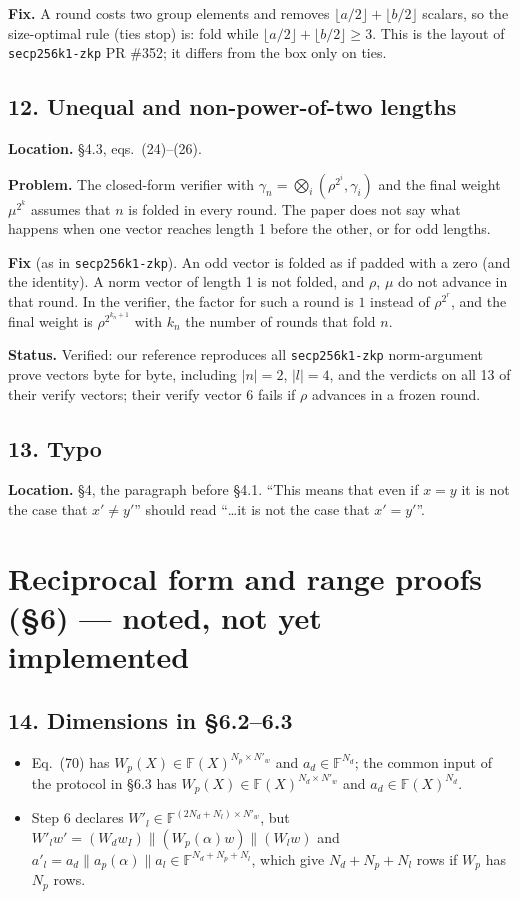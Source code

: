\documentclass[11pt,a4paper]{article}
\newcommand{\F}{\mathbb{F}}
\newcommand{\status}[1]{\par\noindent\textbf{Status.} #1}
\newcommand{\loc}[1]{\par\noindent\textbf{Location.} #1}
\begin{document}
\noindent\textbf{Fix.} A round costs two group elements and removes
$\lfloor a/2\rfloor + \lfloor b/2\rfloor$ scalars, so the size-optimal rule (ties stop) is: fold
while $\lfloor a/2\rfloor + \lfloor b/2\rfloor \ge 3$. This is the layout of
\texttt{secp256k1-zkp} PR \#352; it differs from the box only on ties.

\subsection*{12. Unequal and non-power-of-two lengths}
\loc{\S4.3, eqs.~(24)--(26).}

\noindent\textbf{Problem.} The closed-form verifier with
$\gamma_n = \bigotimes_i (\rho^{2^i}, \gamma_i)$ and the final weight $\mu^{2^k}$ assumes that $n$
is folded in every round. The paper does not say what happens when one vector reaches length 1
before the other, or for odd lengths.

\noindent\textbf{Fix} (as in \texttt{secp256k1-zkp}). An odd vector is folded as if padded with a
zero (and the identity). A norm vector of length 1 is not folded, and $\rho$, $\mu$ do not
advance in that round. In the verifier, the factor for such a round is $1$ instead of
$\rho^{2^r}$, and the final weight is $\rho^{2^{k_n+1}}$ with $k_n$ the number of rounds that fold
$n$.
\status{Verified: our reference reproduces all \texttt{secp256k1-zkp} norm-argument prove
vectors byte for byte, including $|n| = 2$, $|l| = 4$, and the verdicts on all 13 of their verify
vectors; their verify vector 6 fails if $\rho$ advances in a frozen round.}

\subsection*{13. Typo}
\loc{\S4, the paragraph before \S4.1.}
``This means that even if $x = y$ it is not the case that $x' \ne y'$'' should read
``\dots it is not the case that $x' = y'$''.

\section{Reciprocal form and range proofs (\S6) --- noted, not yet implemented}

\subsection*{14. Dimensions in \S6.2--6.3}
\begin{itemize}
  \item Eq.~(70) has $W_p(X) \in \F(X)^{N_p \times N'_w}$ and $a_d \in \F^{N_d}$; the common input
    of the protocol in \S6.3 has $W_p(X) \in \F(X)^{N_d \times N'_w}$ and
    $a_d \in \F(X)^{N_d}$.
  \item Step 6 declares $W'_l \in \F^{(2N_d + N_l) \times N'_w}$, but
    $W'_l w' = (W_d w_I) \| (W_p(\alpha) w) \| (W_l w)$ and
    $a'_l = a_d \| a_p(\alpha) \| a_l \in \F^{N_d + N_p + N_l}$, which give $N_d + N_p + N_l$
    rows if $W_p$ has $N_p$ rows.
\end{itemize}
\end{document}
